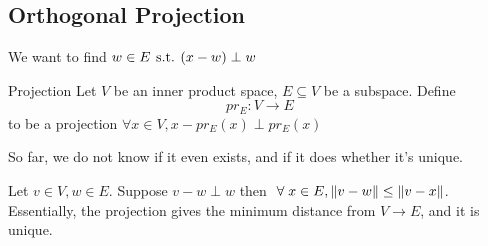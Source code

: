 \subsection{Orthogonal Projection}



We want to find \(w \in E \hspace*{4pt}\text{s.t.}\hspace*{4pt} (x - w) \perp w\)

\begin{definition} {Projection}
    Let \(V\) be an inner product space, \(E \subseteq V\) be a subspace. Define \[
        pr_E: V \to E
    \]
    to be a projection \st \(\forall x \in V, x - pr_E(x) \perp pr_E(x)\)

    So far, we do not know if it even exists, and if it does whether it's unique.
\end{definition}

\vspace{1cm}
\begin{lemma}
    Let \(v \in V, w \in E\). Suppose \(v - w \perp w\) then \(\forall x \in E, \norm{v - w} \leq \norm{v - x}\). Essentially, the projection gives the minimum distance from \(V \to E\), and it is unique.
\end{lemma}

